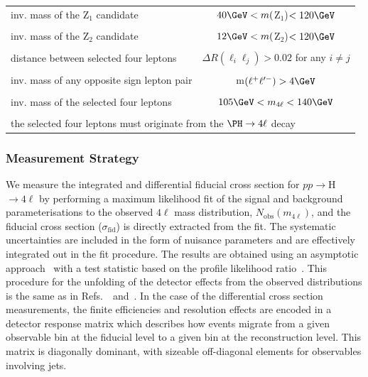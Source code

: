 \begin{table}[!h!tb]
\begin{center}
\begin{tabular}{|lc|}
			inv. mass of the Z$_1$ candidate & $40 \GeV < m($Z$_{1}$)$< 120 \GeV$ \\ 
			\vspace{-0.4cm} & \\
			inv. mass of the Z$_2$ candidate & $12 \GeV < m($Z$_{2}$)$< 120 \GeV$ \\ 
			\vspace{-0.4cm} & \\
			distance between selected four leptons & $\Delta R(\ell_{i}\ell_{j})>0.02$ for any $i\neq j$  \\ 
			\vspace{-0.4cm} & \\
			inv. mass of any opposite sign lepton pair & m$(\ell^{+}\ell'^{-})>4 \GeV$ \\ 
			\vspace{-0.4cm} & \\
			inv. mass of the selected four leptons & $105 \GeV < m_{4\ell} < 140 \GeV$  \\ 
			\vspace{-0.4cm} & \\
			\multicolumn{2}{|l|}{the selected four leptons must originate from the $\Hllll$ decay} \\
			\hline %
			\hline %
		\end{tabular}
		\normalsize
	\end{center}
\end{table}

\subsubsection{Measurement Strategy}

We measure the integrated and differential fiducial cross section for $pp\to$H$\to4\ell$ by performing a maximum likelihood fit of the signal and background parameterisations to the observed $4\ell$ mass distribution, $N_{\mathrm{obs}}(m_{4\ell})$, and the fiducial cross section ($\sigma_{\mathrm{fid}}$) is directly extracted from the fit. The systematic uncertainties are included in the form of nuisance parameters and are effectively integrated out in the fit procedure. The results are obtained using an asymptotic approach~\cite{LHC-HCG} with a test statistic based on the profile likelihood ratio~\cite{Cowan:2010js}. This procedure for the unfolding of the detector effects from the observed distributions is the same as in Refs.~\cite{CMSH4lFiducial8TeV}~and~\cite{CMSHggFiducial8TeV}. In the case of the differential cross section measurements,  the finite efficiencies and resolution effects are encoded in a detector response matrix which describes how events migrate from a given observable bin at the fiducial level to a given bin at the reconstruction level. This matrix is diagonally dominant, with sizeable off-diagonal elements for observables involving jets.

